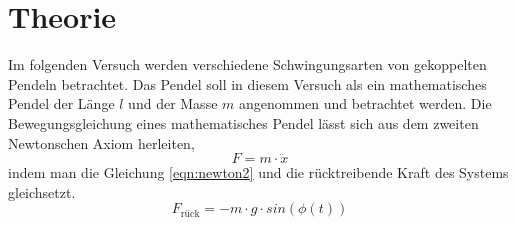 \section{Theorie}
Im folgenden Versuch werden verschiedene Schwingungsarten von gekoppelten Pendeln betrachtet. Das Pendel soll in diesem Versuch als ein mathematisches Pendel der Länge $l$ und der Masse $m$ angenommen und betrachtet werden.
Die Bewegungsgleichung eines mathematisches Pendel lässt sich aus dem zweiten Newtonschen Axiom herleiten,
\begin{equation}
  F=m\cdot\ddot{x} \label{eqn:newton2}
\end{equation}
indem man die Gleichung \eqref{eqn:newton2} und die rücktreibende Kraft des Systems gleichsetzt.
\begin{equation}
  F_\text{rück}=-m\cdot g\cdot sin(\phi(t)) \label{eqn:pendelkraft}
\end{equation}